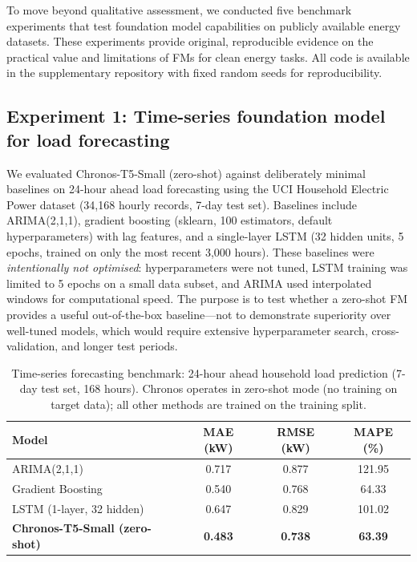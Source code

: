 \documentclass[preprint,12pt]{elsarticle}
\begin{document}
To move beyond qualitative assessment, we conducted five benchmark experiments that test foundation model capabilities on publicly available energy datasets. These experiments provide original, reproducible evidence on the practical value and limitations of FMs for clean energy tasks. All code is available in the supplementary repository with fixed random seeds for reproducibility.

\subsection{Experiment 1: Time-series foundation model for load forecasting}
\label{subsec:exp_ts}

{ We evaluated Chronos-T5-Small \cite{ansari2024chronos} (zero-shot) against deliberately minimal baselines on 24-hour ahead load forecasting using the UCI Household Electric Power dataset (34{,}168 hourly records, 7-day test set). Baselines include ARIMA(2,1,1), gradient boosting (sklearn, 100 estimators, default hyperparameters) with lag features, and a single-layer LSTM (32 hidden units, 5 epochs, trained on only the most recent 3{,}000 hours). These baselines were \textit{intentionally not optimised}: hyperparameters were not tuned, LSTM training was limited to 5 epochs on a small data subset, and ARIMA used interpolated windows for computational speed. The purpose is to test whether a zero-shot FM provides a useful out-of-the-box baseline---not to demonstrate superiority over well-tuned models, which would require extensive hyperparameter search, cross-validation, and longer test periods.\par}

\begin{table}[H]
\centering
\caption{Time-series forecasting benchmark: 24-hour ahead household load prediction (7-day test set, 168 hours). Chronos operates in zero-shot mode (no training on target data); all other methods are trained on the training split.}
\label{tab:ts_benchmark}
\small
\begin{tabular}{@{}lccc@{}}
\toprule
\textbf{Model} & \textbf{MAE (kW)} & \textbf{RMSE (kW)} & \textbf{MAPE (\%)} \\
\midrule
ARIMA(2,1,1) & 0.717 & 0.877 & 121.95 \\
Gradient Boosting & 0.540 & 0.768 & 64.33 \\
LSTM (1-layer, 32 hidden) & 0.647 & 0.829 & 101.02 \\
\textbf{Chronos-T5-Small (zero-shot)} & \textbf{0.483} & \textbf{0.738} & \textbf{63.39} \\
\bottomrule
\end{tabular}
\end{table}
\end{document}
